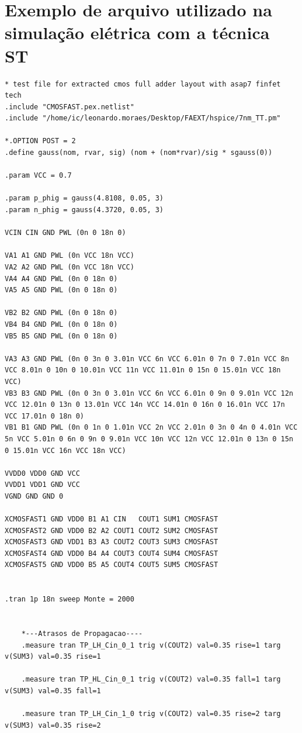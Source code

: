 \documentclass[ecp,tc, english]{iiufrgs}
\begin{document}
\chapter{Exemplo de arquivo utilizado na simulação elétrica com a técnica ST}

\begin{lstlisting}
* test file for extracted cmos full adder layout with asap7 finfet tech
.include "CMOSFAST.pex.netlist"
.include "/home/ic/leonardo.moraes/Desktop/FAEXT/hspice/7nm_TT.pm"

*.OPTION POST = 2
.define gauss(nom, rvar, sig) (nom + (nom*rvar)/sig * sgauss(0))

.param VCC = 0.7

.param p_phig = gauss(4.8108, 0.05, 3)
.param n_phig = gauss(4.3720, 0.05, 3)

VCIN CIN GND PWL (0n 0 18n 0)

VA1 A1 GND PWL (0n VCC 18n VCC)
VA2 A2 GND PWL (0n VCC 18n VCC)
VA4 A4 GND PWL (0n 0 18n 0)
VA5 A5 GND PWL (0n 0 18n 0)

VB2 B2 GND PWL (0n 0 18n 0)
VB4 B4 GND PWL (0n 0 18n 0)
VB5 B5 GND PWL (0n 0 18n 0)

VA3 A3 GND PWL (0n 0 3n 0 3.01n VCC 6n VCC 6.01n 0 7n 0 7.01n VCC 8n VCC 8.01n 0 10n 0 10.01n VCC 11n VCC 11.01n 0 15n 0 15.01n VCC 18n VCC)
VB3 B3 GND PWL (0n 0 3n 0 3.01n VCC 6n VCC 6.01n 0 9n 0 9.01n VCC 12n VCC 12.01n 0 13n 0 13.01n VCC 14n VCC 14.01n 0 16n 0 16.01n VCC 17n VCC 17.01n 0 18n 0)
VB1 B1 GND PWL (0n 0 1n 0 1.01n VCC 2n VCC 2.01n 0 3n 0 4n 0 4.01n VCC 5n VCC 5.01n 0 6n 0 9n 0 9.01n VCC 10n VCC 12n VCC 12.01n 0 13n 0 15n 0 15.01n VCC 16n VCC 18n VCC)

VVDD0 VDD0 GND VCC
VVDD1 VDD1 GND VCC
VGND GND GND 0

XCMOSFAST1 GND VDD0 B1 A1 CIN   COUT1 SUM1 CMOSFAST
XCMOSFAST2 GND VDD0 B2 A2 COUT1 COUT2 SUM2 CMOSFAST
XCMOSFAST3 GND VDD1 B3 A3 COUT2 COUT3 SUM3 CMOSFAST
XCMOSFAST4 GND VDD0 B4 A4 COUT3 COUT4 SUM4 CMOSFAST
XCMOSFAST5 GND VDD0 B5 A5 COUT4 COUT5 SUM5 CMOSFAST


.tran 1p 18n sweep Monte = 2000

    
    *---Atrasos de Propagacao----
    .measure tran TP_LH_Cin_0_1 trig v(COUT2) val=0.35 rise=1 targ v(SUM3) val=0.35 rise=1

    .measure tran TP_HL_Cin_0_1 trig v(COUT2) val=0.35 fall=1 targ v(SUM3) val=0.35 fall=1

    .measure tran TP_LH_Cin_1_0 trig v(COUT2) val=0.35 rise=2 targ v(SUM3) val=0.35 rise=2


\end{lstlisting}
\end{document}

